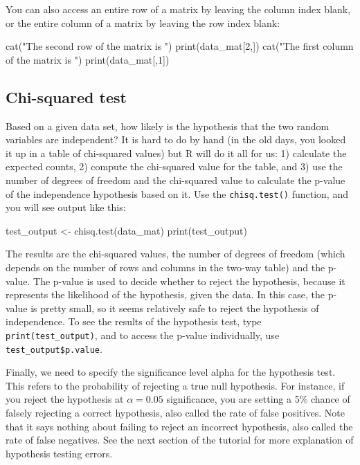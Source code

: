 \documentclass[
  letterpaper,
  DIV=11,
  numbers=noendperiod]{scrreprt}
\newenvironment{Shaded}{\begin{snugshade}}{\end{snugshade}}
\newcommand{\NormalTok}[1]{\textcolor[rgb]{0.00,0.23,0.31}{#1}}
\begin{document}
You can also access an entire row of a matrix by leaving the column
index blank, or the entire column of a matrix by leaving the row index
blank:

\begin{Shaded}
\begin{Highlighting}[]
\NormalTok{cat("The second row of the matrix is ")}
\NormalTok{print(data\_mat[2,])}
\NormalTok{cat("The first column of the matrix is ") }
\NormalTok{print(data\_mat[,1])}
\end{Highlighting}
\end{Shaded}

\hypertarget{chi-squared-test}{%
\subsection*{Chi-squared test}\label{chi-squared-test}}

Based on a given data set, how likely is the hypothesis that the two
random variables are independent? It is hard to do by hand (in the old
days, you looked it up in a table of chi-squared values) but R will do
it all for us: 1) calculate the expected counts, 2) compute the
chi-squared value for the table, and 3) use the number of degrees of
freedom and the chi-squared value to calculate the p-value of the
independence hypothesis based on it. Use the \texttt{chisq.test()}
function, and you will see output like this:

\begin{Shaded}
\begin{Highlighting}[]
\NormalTok{test\_output \textless{}{-} chisq.test(data\_mat)}
\NormalTok{print(test\_output)}
\end{Highlighting}
\end{Shaded}

The results are the chi-squared values, the number of degrees of freedom
(which depends on the number of rows and columns in the two-way table)
and the p-value. The p-value is used to decide whether to reject the
hypothesis, because it represents the likelihood of the hypothesis,
given the data. In this case, the p-value is pretty small, so it seems
relatively safe to reject the hypothesis of independence. To see the
results of the hypothesis test, type \texttt{print(test\_output)}, and
to access the p-value individually, use \texttt{test\_output\$p.value}.

Finally, we need to specify the significance level alpha for the
hypothesis test. This refers to the probability of rejecting a true null
hypothesis. For instance, if you reject the hypothesis at
\(\alpha=0.05\) significance, you are setting a 5\% chance of falsely
rejecting a correct hypothesis, also called the rate of false positives.
Note that it says nothing about failing to reject an incorrect
hypothesis, also called the rate of false negatives. See the next
section of the tutorial for more explanation of hypothesis testing
errors.
\end{document}
